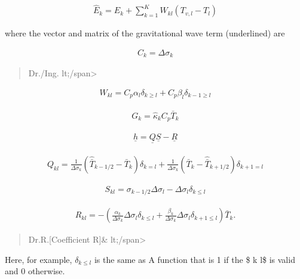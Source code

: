 \begin{eqnarray}
  \hat{E}_k = E_{k}
            + \sum_{k=1}^{K} W_{kl} ( T_{v,l}-T_{l} )
\end{eqnarray}

where the vector and matrix of the gravitational wave term (underlined)
are

\begin{eqnarray}
  C_{k} = \Delta \sigma_{k}
\end{eqnarray}

\begin{quote}
Dr./Ing. lt;/span\textgreater{}
\end{quote}

\begin{eqnarray}
  W_{kl} = C_{p} \alpha_{l} \delta_{k \geq l}
         + C_{p} \beta_{l} \delta_{k-1 \geq l}
\end{eqnarray}

\begin{eqnarray}
  G_{k} = \hat{\kappa}_{k} C_{p} \bar{T}_{k}
\end{eqnarray}

\begin{eqnarray}
\underline{h} = \underline{Q}\underline{S} - \underline{R}
\end{eqnarray}

\begin{eqnarray}
  Q_{kl} = \frac{1}{\Delta \sigma_{k}}
             ( \hat{\bar{T}}_{k-1/2} - \bar{T}_{k} ) \delta_{k=l}
         + \frac{1}{\Delta \sigma_{k}}
             ( \bar{T}_{k} - \hat{\bar{T}}_{k+1/2}  ) \delta_{k+1=l}
\end{eqnarray}

\begin{eqnarray}
  S_{kl} = \sigma_{k-1/2} \Delta \sigma_{l}
           - \Delta \sigma_{l} \delta_{k \leq l }
\end{eqnarray}

\begin{eqnarray}
  R_{kl} = - \left(  \frac{ \alpha_{k} }{ \Delta \sigma_{k} }
                     \Delta \sigma_{l} \delta_{k \leq l}
                   + \frac{ \beta_{k} }{ \Delta \sigma_{k} }
                     \Delta \sigma_{l} \delta_{k+1 \leq l}  
             \right) \bar{T}_{k} .
\end{eqnarray}

\begin{quote}
Dr.R.{[}Coefficient R{]}\& lt;/span\textgreater{}
\end{quote}

Here, for example, \(\delta_{k \leq l}\) is the same as A function that
is 1 if the \$ k \leq l\$ is valid and 0 otherwise.

